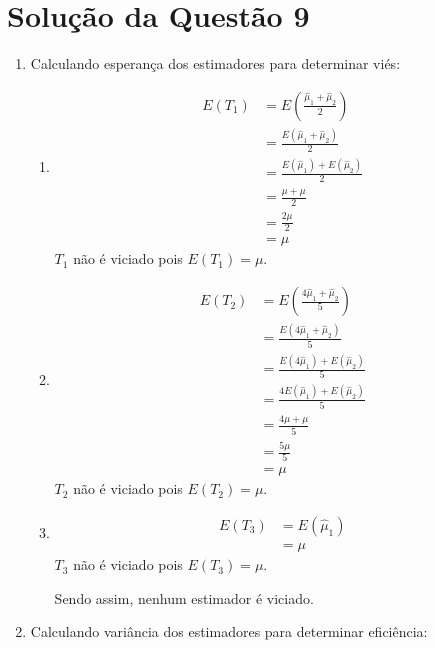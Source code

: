 \documentclass[
	12pt,				%
	openright,			%
	oneside,			%
	a4paper,			%
	english,			%
	brazil,				%
	]{abntex2}
\begin{document}
\section{Solução da Questão 9}
\begin{enumerate}[label=\alph*)]
\item Calculando esperança dos estimadores para determinar viés:

\begin{enumerate}[label=(\roman*)]
        \item 
            \begin{align*}
                E(T_1) &= E\left(\frac{\hat{\mu}_1 + \hat{\mu}_2}{2}\right)\\
                &= \frac{E(\hat{\mu}_1 + \hat{\mu}_2)}{2}\\
                &= \frac{E(\hat{\mu}_1) + E(\hat{\mu}_2)}{2}\\
                &= \frac{\mu + \mu}{2}\\
                &= \frac{2\mu}{2}\\
                &= \mu
            \end{align*}
            $T_1$ não é viciado pois $E(T_1) = \mu$.
        \item
            \begin{align*}
                E(T_2) &= E\left(\frac{4\hat{\mu}_1 + \hat{\mu}_2}{5}\right)\\
                &= \frac{E(4\hat{\mu}_1 + \hat{\mu}_2)}{5}\\
                &= \frac{E(4\hat{\mu}_1) + E(\hat{\mu}_2)}{5}\\
                &= \frac{4E(\hat{\mu}_1) + E(\hat{\mu}_2)}{5}\\
                &= \frac{4\mu + \mu}{5}\\
                &= \frac{5\mu}{5}\\
                &= \mu
            \end{align*}
            $T_2$ não é viciado pois $E(T_2) = \mu$.
        \item
            \begin{align*}
                E(T_3) &= E(\hat{\mu}_1)\\
                &= \mu
            \end{align*}
            $T_3$ não é viciado pois $E(T_3) = \mu$.
            
            Sendo assim, nenhum estimador é viciado.
      \end{enumerate}
\item Calculando variância dos estimadores para determinar eficiência:


\end{enumerate}
\end{document}
